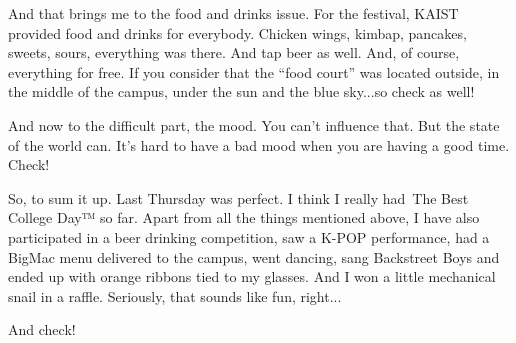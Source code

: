 \begin{post}
\begin{content}
And that brings me to the food and drinks issue. For the festival, KAIST provided food and drinks for everybody. Chicken wings, kimbap, pancakes, sweets, sours, everything was there. And tap beer as well. And, of course, everything for free. If you consider that the ``food court'' was located outside, in the middle of the campus, under the sun and the blue sky...so \textcolor{Chameleon}{check} as well!

And now to the difficult part, the mood. You can't influence that. But the state of the world can. It's hard to have a bad mood when you are having a good time. \textcolor{Chameleon}{Check!}

So, to sum it up. Last Thursday was perfect. I think I really had The Best College Day™ so far. Apart from all the things mentioned above, I have also participated in a beer drinking competition, saw a K-POP performance, had a BigMac menu delivered to the campus, went dancing, sang Backstreet Boys and ended up with orange ribbons tied to my glasses. And I won a little mechanical snail in a raffle. Seriously, that sounds like fun, right...

And \textcolor{Chameleon}{check}!
	\end{content}
\end{post}
